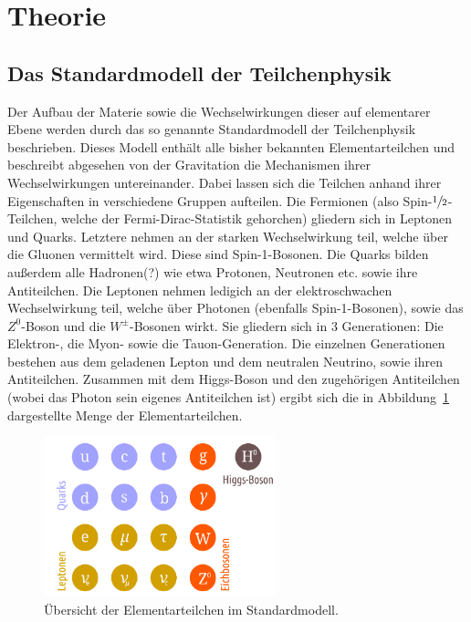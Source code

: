 \section{Theorie}
\label{sec:theorie}

\subsection{Das Standardmodell der Teilchenphysik}

Der Aufbau der Materie sowie die Wechselwirkungen dieser auf elementarer Ebene werden durch das so
genannte Standardmodell der Teilchenphysik beschrieben. Dieses Modell enthält alle bisher bekannten
Elementarteilchen und beschreibt abgesehen von der Gravitation die Mechanismen ihrer Wechselwirkungen
untereinander. Dabei lassen sich die Teilchen anhand ihrer Eigenschaften in verschiedene Gruppen aufteilen.
Die Fermionen (also Spin-$\sfrac{1}{2}$-Teilchen, welche der Fermi-Dirac-Statistik gehorchen) gliedern sich in
Leptonen und Quarks. Letztere nehmen an der starken Wechselwirkung teil, welche über die Gluonen vermittelt wird.
Diese sind Spin-1-Bosonen. Die Quarks bilden außerdem alle Hadronen(?) wie etwa Protonen, Neutronen etc. sowie ihre Antiteilchen. Die
Leptonen nehmen ledigich an der elektroschwachen Wechselwirkung teil, welche über Photonen (ebenfalls
Spin-1-Bosonen), sowie das $Z^0$-Boson und die $W^{\pm}$-Bosonen wirkt. Sie gliedern sich in 3 Generationen: Die Elektron-, die Myon- sowie die Tauon-Generation. Die einzelnen Generationen bestehen aus dem geladenen Lepton und dem neutralen Neutrino, sowie ihren Antiteilchen. Zusammen mit dem Higgs-Boson und den
zugehörigen Antiteilchen (wobei das Photon sein eigenes Antiteilchen ist) ergibt sich die
in Abbildung~\ref{fig:sm} dargestellte Menge der Elementarteilchen.
%
\begin{figure}[htb]
  \centering
  \includegraphics[width=0.6\textwidth]{figures/standardmodell.png}
  \caption{Übersicht der Elementarteilchen im Standardmodell.}
  \label{fig:sm}
\end{figure}
